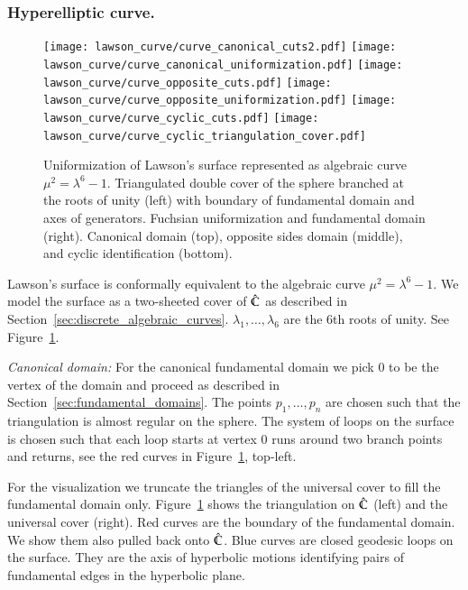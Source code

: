 \documentclass[Thesis]{subfiles}
\begin{document}
\subsubsection{Hyperelliptic curve.}
\label{sec:lawson_curve}

\begin{figure}
	\centering
	\resizebox{!}{6cm} {
	\texttt{[image: lawson\_curve/curve\_canonical\_cuts2.pdf]}
	\texttt{[image: lawson\_curve/curve\_canonical\_uniformization.pdf]}
	}
	\resizebox{!}{6cm} {
	\texttt{[image: lawson\_curve/curve\_opposite\_cuts.pdf]}
	\texttt{[image: lawson\_curve/curve\_opposite\_uniformization.pdf]}
	}
	\resizebox{!}{6cm} {
	\texttt{[image: lawson\_curve/curve\_cyclic\_cuts.pdf]}
	\texttt{[image: lawson\_curve/curve\_cyclic\_triangulation\_cover.pdf]}
	}
	\caption{Uniformization of Lawson's surface represented as algebraic curve $\mu^2=\lambda^6-1$. Triangulated double cover of the sphere branched at the roots of unity (left) with boundary of fundamental domain and axes of generators. Fuchsian uniformization and fundamental domain (right). Canonical domain (top), opposite sides domain (middle), and cyclic identification (bottom).}
	\label{fig:lawson_curve}
\end{figure}

Lawson's surface is conformally equivalent to the algebraic curve $\mu^2=\lambda^6-1$.
We model the surface as a two-sheeted cover of $\hat {\mathbb C}$ as described in Section~\ref{sec:discrete_algebraic_curves}. $\lambda_1,\ldots,\lambda_6$ are the 6th roots of unity.
See Figure~\ref{fig:lawson_curve}.

\textit{Canonical domain:}
For the canonical fundamental domain we pick $0$ to be the vertex of the domain and proceed as described in Section~\ref{sec:fundamental_domains}.
The points $p_1,\ldots,p_n$ are chosen such that the triangulation is almost regular on the sphere.
The system of loops on the surface is chosen such that each loop starts at vertex $0$ runs around two branch points and returns, see the red curves in Figure~\ref{fig:lawson_curve}, top-left.

For the visualization we truncate the triangles of the universal cover to fill the fundamental domain only.
Figure~\ref{fig:lawson_curve} shows the triangulation on $\hat {\mathbb C}$ (left) and the universal cover (right).
Red curves are the boundary of the fundamental domain.
We show them also pulled back onto $\hat {\mathbb C}$. Blue curves are closed geodesic loops on the surface.
They are the axis of hyperbolic motions identifying pairs of fundamental edges in the hyperbolic plane.
\end{document}
